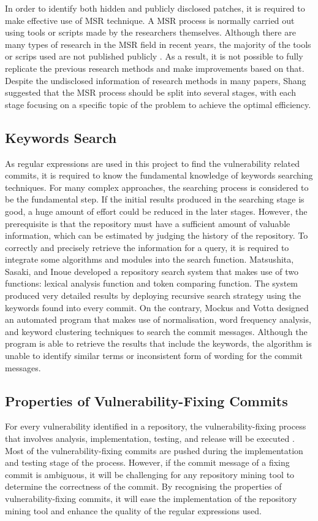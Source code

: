 \documentclass[12pt, a4paper]{report}
\begin{document}
In order to identify both hidden and publicly disclosed patches, it is required to make effective
use of MSR technique. A MSR process is normally carried out using tools or scripts made by the
researchers themselves. Although there are many types of research in the MSR field in recent years,
the majority of the tools or scrips used are not published publicly \cite{robles_2010}. As a result,
it is not possible to fully replicate the previous research methods and make improvements based on
that. Despite the undisclosed information of research methods in many papers, Shang
\cite{shang_2009} suggested that the MSR process should be split into several stages, with each
stage focusing on a specific topic of the problem to achieve the optimal efficiency.

\subsection{Keywords Search}
As regular expressions are used in this project to find the vulnerability related commits, it is
required to know the fundamental knowledge of keywords searching techniques. For many complex
approaches, the searching process is considered to be the fundamental step. If the initial results
produced in the searching stage is good, a huge amount of effort could be reduced in the later
stages. However, the prerequisite is that the repository must have a sufficient amount of valuable
information, which can be estimated by judging the history of the repository. To correctly and
precisely retrieve the information for a query, it is required to integrate some algorithms and
modules into the search function. Matsushita, Sasaki, and Inoue \cite{matsushita_2005} developed a
repository search system that makes use of two functions: lexical analysis function and token
comparing function. The system produced very detailed results by deploying recursive search strategy
using the keywords found into every commit. On the contrary, Mockus and Votta \cite{mockus_2000}
designed an automated program that makes use of normalisation, word frequency analysis, and keyword
clustering techniques to search the commit messages. Although the program is able to retrieve the
results that include the keywords, the algorithm is unable to identify similar terms or inconsistent
form of wording for the commit messages.

\subsection{Properties of Vulnerability-Fixing Commits}
For every vulnerability identified in a repository, the vulnerability-fixing process that involves
analysis, implementation, testing, and release will be executed \cite{othmane_2015}. Most of the
vulnerability-fixing commits are pushed during the implementation and testing stage of the process.
However, if the commit message of a fixing commit is ambiguous, it will be challenging for any
repository mining tool to determine the correctness of the commit. By recognising the properties of
vulnerability-fixing commits, it will ease the implementation of the repository mining tool and
enhance the quality of the regular expressions used.
\end{document}
